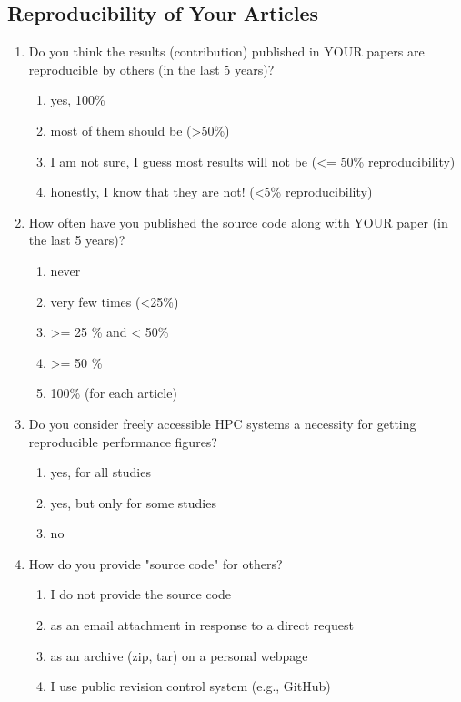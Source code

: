 \documentclass{article}\usepackage[]{graphicx}\usepackage[]{color}
\begin{document}
\subsection{Reproducibility of Your Articles}
\label{sec-3}

\begin{enumerate}
\item Do you think the results (contribution) published in YOUR papers
are reproducible by others (in the last 5 years)?
\begin{enumerate}
\item yes, 100\%
\item most of them should be (>50\%)
\item I am not sure, I guess most results will not be (<= 50\%
reproducibility)
\item honestly, I know that they are not! (<5\% reproducibility)
\end{enumerate}

\item How often have you published the source code along with YOUR paper
(in the last 5 years)?
\begin{enumerate}
\item never
\item very few times (<25\%)
\item >= 25 \% and < 50\%
\item >= 50 \%
\item 100\% (for each article)
\end{enumerate}

\item Do you consider freely accessible HPC systems a necessity for
getting reproducible performance figures?
\begin{enumerate}
\item yes, for all studies
\item yes, but only for some studies
\item no
\end{enumerate}

\item How do you provide "source code" for others? 
\begin{enumerate}
\item I do not provide the source code
\item as an email attachment in response to a direct request
\item as an archive (zip, tar) on a personal webpage
\item I use public revision control system (e.g., GitHub)
\end{enumerate}


\end{enumerate}
\end{document}
